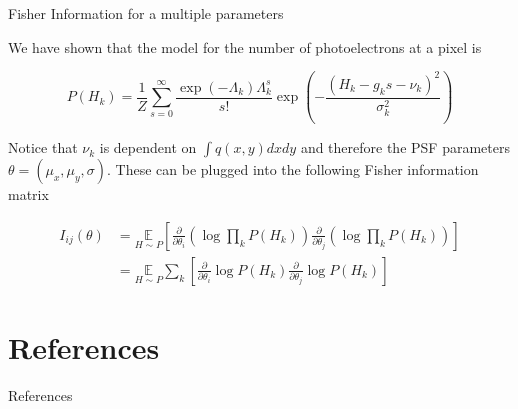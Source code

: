 \documentclass[aspectratio=1610]{beamer}					%
\begin{document}
\begin{frame}{Fisher Information for a multiple parameters}

We have shown that the model for the number of photoelectrons at a pixel is

\begin{equation*}
P(H_{k}) = \frac{1}{Z}\sum_{s=0}^{\infty}\frac{\exp\left({-\Lambda_{k}}\right)\Lambda_{k}^{s}}{s!}\exp\left(-\frac{(H_{k}-g_{k}s-\nu_{k})^{2}}{\sigma_{k}^{2}}\right)
\end{equation*}

Notice that $\nu_{k}$ is dependent on $\int q(x,y)dxdy$ and therefore the PSF parameters $\theta = (\mu_{x},\mu_{y},\sigma)$. These can be plugged into the following Fisher information matrix

\begin{align*}
I_{ij}(\theta) &= \underset{{H\sim P}}{\mathbb{E}}\left[\frac{\partial}{\partial\theta_{i}} \left(\log \prod_{k} P(H_{k})\right)\frac{\partial}{\partial\theta_{j}} \left(\log \prod_{k} P(H_{k})\right)\right]\\
&= \underset{{H\sim P}}{\mathbb{E}}\sum_{k}\left[\frac{\partial}{\partial\theta_{i}} \log P(H_{k})\frac{\partial}{\partial\theta_{j}} \log P(H_{k})\right]
\end{align*}

\end{frame}



\section{References}

\begin{frame}[allowframebreaks]{References}
	\tiny
	
\end{frame}
\end{document}

